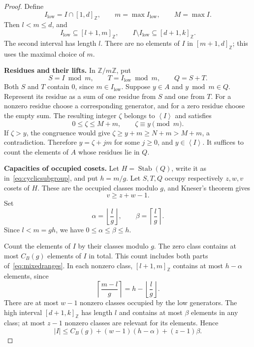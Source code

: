 \documentclass[11pt,a4paper]{article}
\numberwithin{equation}{section}
\theoremstyle{remark}
\newcommand{\Z}{\mathbb Z}
\newcommand{\sg}[1]{\left\langle #1\right\rangle}
\newcommand{\floor}[1]{\left\lfloor #1\right\rfloor}
\newcommand{\ceil}[1]{\left\lceil #1\right\rceil}
\DeclareMathOperator{\Stab}{Stab}
\newcommand{\interval}[2]{[#1,#2]_{\Z}}
\begin{document}
\begin{proof}
Define
\begin{equation}\label{eq:mixedlow}
  I_{\mathrm{low}}=I\cap\interval{1}{d},\qquad
  m=\max I_{\mathrm{low}},\qquad M=\max I.
\end{equation}
Then $l<m\le d$, and
\begin{equation}\label{eq:mixedranges}
  I_{\mathrm{low}}\subseteq\interval{l+1}{m},
  \qquad
  I\setminus I_{\mathrm{low}}\subseteq\interval{d+1}{k}.
\end{equation}
The second interval has length $l$. There are no elements of $I$ in
$\interval{m+1}{d}$; this uses the maximal choice of $m$.

\textbf{Residues and their lifts.}
In $\Z/m\Z$, put
\begin{equation}\label{eq:mixedsumset}
  S=I\bmod m,\qquad T=I_{\mathrm{low}}\bmod m,\qquad Q=S+T.
\end{equation}
Both $S$ and $T$ contain $0$, since $m\in I_{\mathrm{low}}$.
Suppose $y\in A$ and $y\bmod m\in Q$.
Represent its residue as a sum of one residue from $S$ and one from $T$.
For a nonzero residue choose a corresponding generator, and for a zero
residue choose the empty sum. The resulting integer $\zeta$ belongs to
$\sg{I}$ and satisfies
\begin{equation}\label{eq:mixedlift}
  0\le \zeta\le M+m,\qquad \zeta\equiv y\pmod m.
\end{equation}
If $\zeta>y$, the congruence would give
$\zeta\ge y+m\ge N+m>M+m$, a contradiction.
Therefore $y=\zeta+jm$ for some $j\ge0$, and $y\in\sg{I}$.
It suffices to count the elements of $A$ whose residues lie in $Q$.

\textbf{Capacities of occupied cosets.}
Let $H=\Stab(Q)$, write it as in~\eqref{eq:cyclicsubgroup}, and put
$h=m/g$. Let $S,T,Q$ occupy respectively $z,w,v$ cosets of $H$.
These are the occupied classes modulo $g$, and Kneser's theorem gives
\begin{equation}\label{eq:mixedkneser}
  v\ge z+w-1.
\end{equation}
Set
\begin{equation}\label{eq:alphabeta}
  \alpha=\floor{\frac{l}{g}},\qquad
  \beta=\ceil{\frac{l}{g}}.
\end{equation}
Since $l<m=gh$, we have $0\le\alpha\le\beta\le h$.

Count the elements of $I$ by their classes modulo $g$.
The zero class contains at most $C_B(g)$ elements of $I$ in total.
This count includes both parts of~\eqref{eq:mixedranges}.
In each nonzero class, $\interval{l+1}{m}$ contains at most
$h-\alpha$ elements, since
\[
  \ceil{\frac{m-l}{g}}=h-\floor{\frac{l}{g}}.
\]
There are at most $w-1$ nonzero classes occupied by the low generators.
The high interval $\interval{d+1}{k}$ has length $l$ and contains
at most $\beta$ elements in any class; at most $z-1$ nonzero classes
are relevant for its elements. Hence
\begin{equation}\label{eq:mixedupper}
  |I|\le C_B(g)+(w-1)(h-\alpha)+(z-1)\beta.
\end{equation}


\end{proof}
\end{document}
